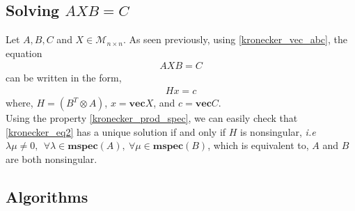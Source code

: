 \subsection{Solving $AXB=C$}
Let $A,B,C$ and $X \in \mathcal{M}_{n \times n}$. As seen previously, using \ref{kronecker_vec_abc}, the equation 
\begin{align}
\label{kronecker_eq2}
AXB=C
\end{align}
can be written in the form,
\begin{align}
H x = c
\end{align}
where,
$H = (B^T \otimes A)$, $x = \mathbf{vec}X $, and $c = \mathbf{vec}C$.
\\
Using the property \ref{kronecker_prod_spec}, we can easily check that \ref{kronecker_eq2} has a unique solution if and only if $H$ is nonsingular, \textit{i.e} $\lambda  \mu \neq 0,~~\forall \lambda \in \mathbf{mspec}(A),~\forall \mu \in \mathbf{mspec}(B)$, which is equivalent to, $A$ and $B$ are both nonsingular.


\subsection{Algorithms}
